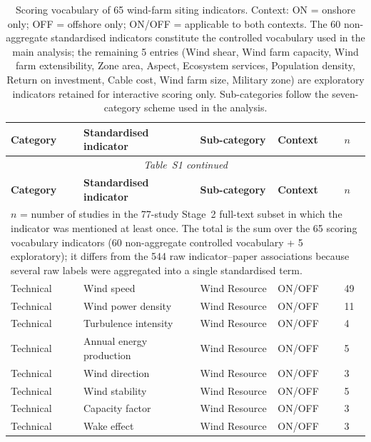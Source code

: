 \documentclass[12pt,a4paper]{article}
\begin{document}
\newpage
\begin{center}
\renewcommand{\arraystretch}{1.05}
\small
\begin{longtable}{p{2.1cm}p{3.5cm}p{2.0cm}p{2.0cm}p{1.2cm}}
\caption{Scoring vocabulary of 65 wind-farm siting indicators. Context: ON = onshore only; OFF = offshore only; ON/OFF = applicable to both contexts. The 60 non-aggregate standardised indicators constitute the controlled vocabulary used in the main analysis; the remaining 5 entries (Wind shear, Wind farm capacity, Wind farm extensibility, Zone area, Aspect, Ecosystem services, Population density, Return on investment, Cable cost, Wind farm size, Military zone) are exploratory indicators retained for interactive scoring only. Sub-categories follow the seven-category scheme used in the analysis.}\\
\toprule
\textbf{Category} & \textbf{Standardised indicator} & \textbf{Sub-category} & \textbf{Context} & \textbf{$n$} \\
\midrule
\endfirsthead
\multicolumn{5}{c}{\small\textit{Table~S1 continued}}\\
\toprule
\textbf{Category} & \textbf{Standardised indicator} & \textbf{Sub-category} & \textbf{Context} & \textbf{$n$} \\
\midrule
\endhead
\bottomrule
\multicolumn{5}{p{0.95\textwidth}}{\small $n$ = number of studies in the 77-study Stage~2 full-text subset in which the indicator was mentioned at least once. The total is the sum over the 65 scoring vocabulary indicators (60 non-aggregate controlled vocabulary + 5 exploratory); it differs from the 544 raw indicator--paper associations because several raw labels were aggregated into a single standardised term.}\\
\endlastfoot
Technical & Wind speed & Wind Resource & ON/OFF & 49 \\
Technical & Wind power density & Wind Resource & ON/OFF & 11 \\
Technical & Turbulence intensity & Wind Resource & ON/OFF & 4 \\
Technical & Annual energy production & Wind Resource & ON/OFF & 5 \\
Technical & Wind direction & Wind Resource & ON/OFF & 3 \\
Technical & Wind stability & Wind Resource & ON/OFF & 5 \\
Technical & Capacity factor & Wind Resource & ON/OFF & 3 \\
Technical & Wake effect & Wind Resource & ON/OFF & 3 \\

\end{longtable}
\end{center}
\end{document}

